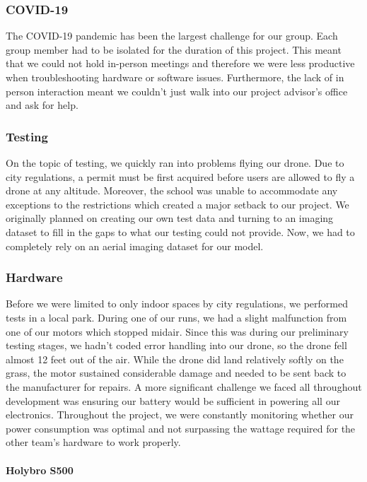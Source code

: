    \subsubsection{COVID-19}
The COVID-19 pandemic has been the largest challenge for our group. Each group member had to be isolated for the duration of this project. This meant that we could not hold in-person meetings and therefore we were less productive when troubleshooting hardware or software issues. Furthermore, the lack of in person interaction meant we couldn’t just walk into our project advisor’s office and ask for help. 

    \subsubsection{Testing}

On the topic of testing, we quickly ran into problems flying our drone. Due to city regulations, a permit must be first acquired before users are allowed to fly a drone at any altitude. Moreover, the school was unable to accommodate any exceptions to the restrictions which created a major setback to our project. We originally planned on creating our own test data and turning to an imaging dataset to fill in the gaps to what our testing could not provide. Now, we had to completely rely on an aerial imaging dataset for our model. 

    \subsubsection{Hardware}

Before we were limited to only indoor spaces by city regulations, we performed tests in a local park. During one of our runs, we had a slight malfunction from one of our motors which stopped midair. Since this was during our preliminary testing stages, we hadn’t coded error handling into our drone, so the drone fell almost 12 feet out of the air. While the drone did land relatively softly on the grass, the motor sustained considerable damage and needed to be sent back to the manufacturer for repairs. 
A more significant challenge we faced all throughout development was ensuring our battery would be sufficient in powering all our electronics. Throughout the project, we were constantly monitoring whether our power consumption was optimal and not surpassing the wattage required for the other team’s hardware to work properly. 

    \paragraph{Holybro S500}



